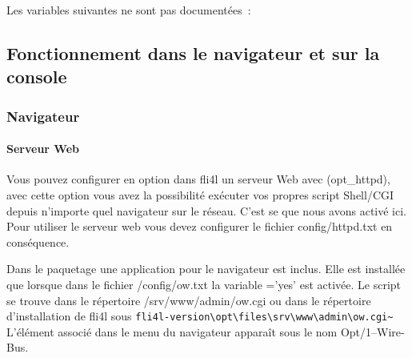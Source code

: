 Les variables suivantes ne sont pas documentées~:
\begin{description}


\end{description}

\subsection{Fonctionnement dans le navigateur et sur la console}

{
\subsubsection{Navigateur}
}
\paragraph{Serveur Web}
Vous pouvez configurer en option dans fli4l un serveur Web avec (opt\_httpd), avec cette
option vous avez la possibilité exécuter vos propres script Shell/CGI depuis n'importe
quel navigateur sur le réseau. C'est se que nous avons activé ici. Pour utiliser le serveur web
vous devez configurer le fichier config/httpd.txt en conséquence.

Dans le paquetage  une application pour le navigateur est inclus.
Elle est installée que lorsque dans le fichier /config/ow.txt la variable ='yes'
est activée. Le script se trouve dans le répertoire /srv/www/admin/ow.cgi ou dans le répertoire
d'installation de fli4l sous \verb!fli4l-version\opt\files\srv\www\admin\ow.cgi~! L'élément
associé dans le menu du navigateur apparaît sous le nom \flqq{}Opt/1--Wire-Bus\frqq{}.

